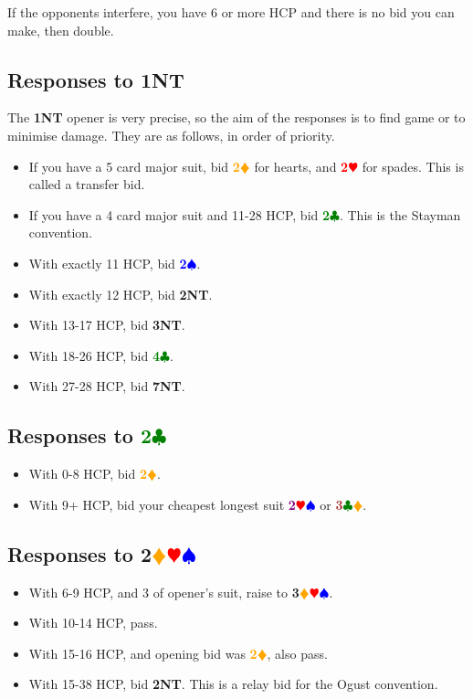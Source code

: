 \documentclass{article}
\newcommand{\Hs}{\textcolor{Red}{$\varheart$}}
\newcommand{\Ss}{\textcolor{Blue}{$\spadesuit$}}
\newcommand{\Ds}{\textcolor{Orange}{$\vardiamond$}}
\newcommand{\Cs}{\textcolor{Green}{$\clubsuit$}}
\newcommand{\NTs}{\textbf{\footnotesize{NT}}}
\renewcommand{\H}[1]{\textcolor{Red}{\textbf{#1}\Hs}}
\renewcommand{\S}[1]{\textcolor{Blue}{\textbf{#1}\Ss}}
\newcommand{\D}[1]{\textcolor{Orange}{\textbf{#1}\Ds}}
\newcommand{\C}[1]{\textcolor{Green}{\textbf{#1}\Cs}}
\newcommand{\NT}[1]{\textbf{#1\NTs}}
\newcommand{\minors}[1]{\textcolor{Brown}{\textbf{#1}}\Cs\Ds}
\newcommand{\majors}[1]{\textcolor{Purple}{\textbf{#1}}\Hs\Ss}
\newcommand{\notclubs}[1]{\textbf{#1}\Ds\Hs\Ss}
\begin{document}
If the opponents interfere, you have 6 or more HCP and there is no bid you can make, then double.

\subsection{Responses to \NT{1}}

The \NT{1} opener is very precise, so the aim of the responses is to find game or to minimise damage. They are as follows, in order of priority.

\begin{itemize}
\item If you have a 5 card major suit, bid \D{2} for hearts, and \H{2} for spades. This is called a transfer bid.
\item If you have a 4 card major suit and 11-28 HCP, bid \C{2}. This is the Stayman convention.
\item With exactly 11 HCP, bid \S{2}.
\item With exactly 12 HCP, bid \NT{2}.
\item With 13-17 HCP, bid \NT{3}.
\item With 18-26 HCP, bid \C{4}.
\item With 27-28 HCP, bid \NT{7}.
\end{itemize}

\subsection{Responses to \C{2}}

\begin{itemize}
\item With 0-8 HCP, bid \D{2}.
\item With 9+ HCP, bid your cheapest longest suit \majors{2} or \minors{3}.
\end{itemize}

\subsection{Responses to \notclubs{2}}

\begin{itemize}
\item With 6-9 HCP, and 3 of opener's suit, raise to \notclubs{3}.
\item With 10-14 HCP, pass.
\item With 15-16 HCP, and opening bid was \D{2}, also pass.
\item With 15-38 HCP, bid \NT{2}. This is a relay bid for the Ogust convention.
\end{itemize}
\end{document}

